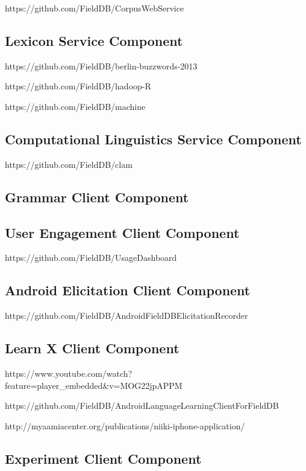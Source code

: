 \documentclass[12pt]{article}
\begin{document}
https://github.com/FieldDB/CorpusWebService

\subsection{Lexicon Service Component}


https://github.com/FieldDB/berlin-buzzwords-2013

https://github.com/FieldDB/hadoop-R

https://github.com/FieldDB/machine

\subsection{Computational Linguistics Service Component}

https://github.com/FieldDB/clam

\subsection{Grammar Client Component}

\subsection{User Engagement Client Component}

https://github.com/FieldDB/UsageDashboard

\subsection{Android Elicitation Client Component}

https://github.com/FieldDB/AndroidFieldDBElicitationRecorder

\subsection{Learn X Client Component}

https://www.youtube.com/watch?feature=player\_embedded\&v=MOG22jpAPPM

https://github.com/FieldDB/AndroidLanguageLearningClientForFieldDB

http://myaamiacenter.org/publications/niiki-iphone-application/

\subsection{Experiment Client Component}
\end{document}
